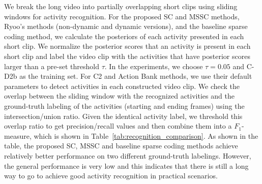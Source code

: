 We break the long video into partially overlapping short clips using sliding
windows for activity recognition. For the proposed SC and MSSC methods, Ryoo's
methods (non-dynamic and dynamic versions), and the baseline sparse coding
method, we calculate the posteriors {\color{black}of each activity presented in
  each short clip}. We normalize the posterior scores that an activity is
present in each short clip and label the video clip with the activities that
have posterior scores larger than a pre-set threshold $\tau$. In the
experiments, we choose $\tau= 0.05$ and C-D2b as the training set.  For C2 and
Action Bank methods, we use their default parameters to detect activities in
each constructed video clip. We check the overlap between the sliding window
with the recognized activities and the ground-truth labeling of the activities
(starting and ending frames) using the intersection/union ratio. Given the
identical activity label, we threshold this overlap ratio to get
precision/recall values and then combine them into a $F_1$-measure, which is
shown in Table~\ref{tab:recognition_comparison}. As shown in the table, the
proposed SC, MSSC and baseline sparse coding methods achieve relatively better
performance on two different ground-truth labelings. However, the general
performance is very low and this indicates that there is still a long way to go
to achieve good activity recognition in practical scenarios.
